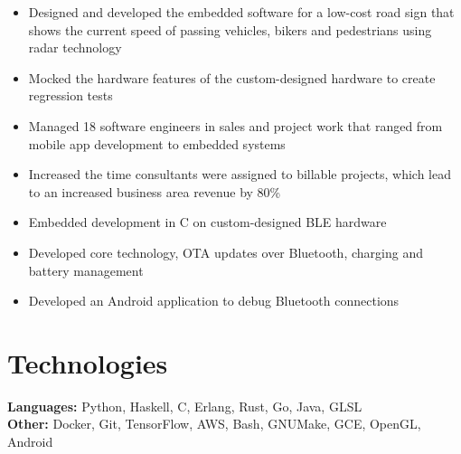 \documentclass{cv_doc}
\begin{document}

\begin{itemize}[label={\tiny\raisebox{1ex}{\textbullet}}]
  \item {Designed and developed the embedded software for a low-cost road sign
  that shows the current speed of passing vehicles, bikers and pedestrians
  using radar technology}
  \item {Mocked the hardware features of the custom-designed hardware to create
  regression tests}
\end{itemize}


\begin{itemize}[label={\tiny\raisebox{1ex}{\textbullet}}]
  \item {Managed 18 software engineers in sales and project work that ranged
  from mobile app development to embedded systems}
  \item {Increased the time consultants were assigned to billable projects,
  which lead to an increased business area revenue by 80\%}
\end{itemize}


\begin{itemize}[label={\tiny\raisebox{1ex}{\textbullet}}]
  \item {Embedded development in C on custom-designed BLE hardware}
  \item {Developed core technology, OTA updates over Bluetooth, charging
  and battery management}
  \item {Developed an Android application to debug Bluetooth connections}
\end{itemize}

\section*{Technologies}

\textbf{Languages:} Python, Haskell, C, Erlang, Rust, Go, Java, GLSL \\
\textbf{Other:} Docker, Git, TensorFlow, AWS, Bash, GNUMake, GCE, OpenGL,
Android
\end{document}
